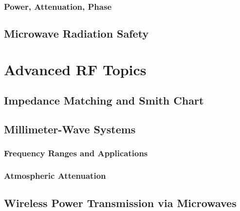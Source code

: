 \documentclass[11pt]{article}
\begin{document}
\subsubsection{Power, Attenuation, Phase}
\subsection{Microwave Radiation Safety} \label{subsec:microwave_safety}

\section{Advanced RF Topics} \label{sec:advanced_rf}
\subsection{Impedance Matching and Smith Chart}
\label{subsec:impedance_matching}
\subsection{Millimeter-Wave Systems} \label{subsec:mm_wave}
\subsubsection{Frequency Ranges and Applications}
\subsubsection{Atmospheric Attenuation}
\subsection{Wireless Power Transmission via Microwaves}
\label{subsec:wireless_power}

\newpage
\ifdefined\HCode
\else
{}
\fi
\printbibliography
\end{document}
